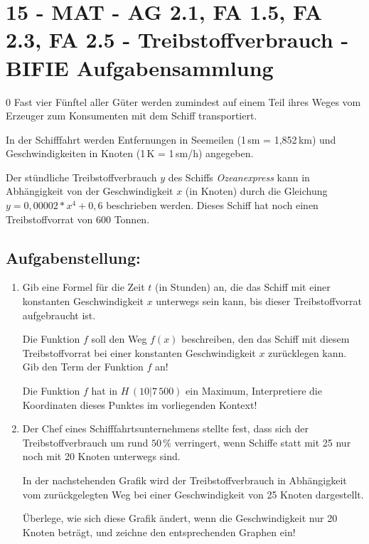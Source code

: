 \section{15 - MAT - AG 2.1, FA 1.5, FA 2.3, FA 2.5 - Treibstoffverbrauch - BIFIE Aufgabensammlung}

\begin{langesbeispiel} \item[0] %
				Fast vier Fünftel aller Güter werden zumindest auf einem Teil ihres Weges vom Erzeuger zum Konsumenten mit dem Schiff transportiert.
				
				In der Schifffahrt werden Entfernungen in Seemeilen (1\,sm = 1,852\,km) und Geschwindigkeiten in Knoten (1\,K = 1\,sm/h) angegeben.
				
				Der stündliche Treibstoffverbrauch $y$ des Schiffs \textit{Ozeanexpress} kann in Abhängigkeit von der Geschwindigkeit $x$ (in Knoten) durch die Gleichung $y=0,00002*x^4+0,6$ beschrieben werden. Dieses Schiff hat noch einen Treibstoffvorrat von 600 Tonnen.
				
\subsection{Aufgabenstellung:}
\begin{enumerate}
	\item Gib eine Formel für die Zeit $t$ (in Stunden) an, die das Schiff mit einer konstanten Geschwindigkeit $x$ unterwegs sein kann, bis dieser Treibstoffvorrat aufgebraucht ist.
	
	Die Funktion $f$ soll den Weg $f(x)$ beschreiben, den das Schiff mit diesem Treibstoffvorrat bei einer konstanten Geschwindigkeit $x$ zurücklegen kann. Gib den Term der Funktion $f$ an!
	
	Die Funktion $f$ hat in $H\,(10|7\,500)$ ein Maximum, Interpretiere die Koordinaten dieses Punktes im vorliegenden Kontext!
	
	\item Der Chef eines Schifffahrtsunternehmens stellte fest, dass sich der Treibstoffverbrauch um rund $50\,\%$ verringert, wenn Schiffe statt mit 25 nur noch mit 20 Knoten unterwegs sind.
	
	In der nachstehenden Grafik wird der Treibstoffverbrauch in Abhängigkeit vom zurückgelegten Weg bei einer Geschwindigkeit von 25 Knoten dargestellt.
	
	Überlege, wie sich diese Grafik ändert, wenn die Geschwindigkeit nur 20 Knoten beträgt, und zeichne den entsprechenden Graphen ein!
	

\end{enumerate}
\end{langesbeispiel}
